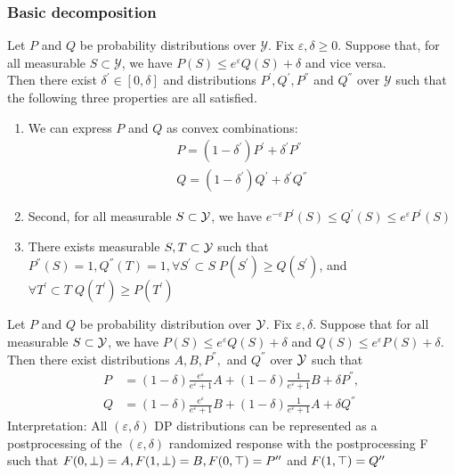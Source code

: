 \documentclass[10pt]{article}
\begin{document}
\subsubsection{Basic decomposition} Let $P$ and $Q$ be probability distributions over $\mathcal{Y}$. Fix $\varepsilon, \delta \geq 0$. Suppose that, for all measurable $S \subset \mathcal{Y}$, we have $P(S) \leq e^{\varepsilon} Q(S) + \delta$ and vice versa. \\
Then there exist $\delta^{\prime} \in [0, \delta]$ and distributions $P^{\prime}, Q^{\prime}, P^{\dprime}$ and $Q^{\dprime}$ over $\mathcal{Y}$ such that the following three properties are all satisfied. 
\begin{enumerate}
    \item We can express $P$ and $Q$ as convex combinations:
    \begin{align*}
        P = (1-\delta^{\prime})P^{\prime} + \delta^{\prime}P^{\dprime} \\ 
        Q = (1-\delta^{\prime})Q^{\prime} + \delta^{\prime}Q^{\dprime} 
    \end{align*}
    \item Second, for all measurable $S \subset \mathcal{Y}$, we have $e^{-\varepsilon} P^{\prime} (S) \leq Q^{\prime} (S)  \leq e^{\varepsilon} P^{\prime} (S)$
    \item There exists measurable $S, T \subset \mathcal{Y}$ such that $P^{\dprime}(S) =1 , Q^{\dprime}(T) = 1, \forall S^{\prime} \subset S \; P(S^{\prime} )\geq Q(S^{\prime})$, and $\forall T^{\prime} \subset T \; Q(T^{\prime}) \geq P(T^{\prime})$
\end{enumerate}
Let $P$ and $Q$ be probability distribution over $\mathcal{Y}$. Fix $\varepsilon, \delta$. Suppose that for all measurable $S \subset \mathcal{Y}$, we have $P(S) \leq e^{\varepsilon} Q(S) + \delta$ and $Q(S) \leq e^{\varepsilon} P(S) + \delta$. Then there exist distributions $A,B, P^{\dprime},$ and $Q^{\dprime}$ over $\mathcal{Y}$ such that 
\begin{align*}
    P &= (1- \delta) \frac{e^{\varepsilon}}{e^{\varepsilon}+1 } A + (1- \delta) \frac{1}{e^{\varepsilon}+1} B + \delta P^{\dprime}, \\ 
    Q &= (1-\delta) \frac{e^{\varepsilon}}{e^{\varepsilon}+1}B + (1- \delta) \frac{1}{e^{\varepsilon}+1} A + \delta Q^{\dprime}
\end{align*}
\alert{Interpretation: } All $(\varepsilon, \delta)$ DP distributions can be represented as a postprocessing of the $(\varepsilon, \delta)$ randomized response with the postprocessing F such that $F(0, \perp) =A, F(1, \perp) = B, F(0, \tang) = P^{\dprime} $ and $F(1, \tang) = Q^{\dprime}$
\end{document}

